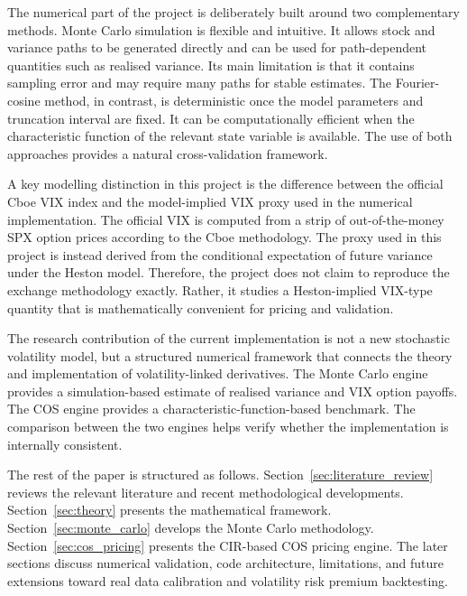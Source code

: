 The numerical part of the project is deliberately built around two complementary methods. Monte Carlo simulation is flexible and intuitive. It allows stock and variance paths to be generated directly and can be used for path-dependent quantities such as realised variance. Its main limitation is that it contains sampling error and may require many paths for stable estimates. The Fourier-cosine method, in contrast, is deterministic once the model parameters and truncation interval are fixed. It can be computationally efficient when the characteristic function of the relevant state variable is available. The use of both approaches provides a natural cross-validation framework.

A key modelling distinction in this project is the difference between the official Cboe VIX index and the model-implied VIX proxy used in the numerical implementation. The official VIX is computed from a strip of out-of-the-money SPX option prices according to the Cboe methodology. The proxy used in this project is instead derived from the conditional expectation of future variance under the Heston model. Therefore, the project does not claim to reproduce the exchange methodology exactly. Rather, it studies a Heston-implied VIX-type quantity that is mathematically convenient for pricing and validation.

The research contribution of the current implementation is not a new stochastic volatility model, but a structured numerical framework that connects the theory and implementation of volatility-linked derivatives. The Monte Carlo engine provides a simulation-based estimate of realised variance and VIX option payoffs. The COS engine provides a characteristic-function-based benchmark. The comparison between the two engines helps verify whether the implementation is internally consistent.

The rest of the paper is structured as follows. Section~\ref{sec:literature_review} reviews the relevant literature and recent methodological developments. Section~\ref{sec:theory} presents the mathematical framework. Section~\ref{sec:monte_carlo} develops the Monte Carlo methodology. Section~\ref{sec:cos_pricing} presents the CIR-based COS pricing engine. The later sections discuss numerical validation, code architecture, limitations, and future extensions toward real data calibration and volatility risk premium backtesting.